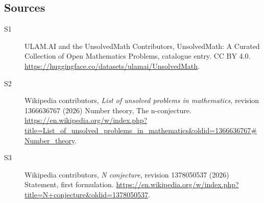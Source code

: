 \documentclass[11pt]{article}
\begin{document}
\subsection{Sources}
\begin{description}
\item[\hypertarget{source:statement:1}{S1}] ULAM.AI and the UnsolvedMath Contributors, UnsolvedMath: A Curated Collection of Open Mathematics Problems, catalogue entry. CC BY 4.0. \url{https://huggingface.co/datasets/ulamai/UnsolvedMath}.
\item[\hypertarget{source:statement:2}{S2}] Wikipedia contributors, \emph{List of unsolved problems in mathematics}, revision 1366636767 (2026) Number theory, The n-conjecture. \url{https://en.wikipedia.org/w/index.php?title=List_of_unsolved_problems_in_mathematics&oldid=1366636767#Number_theory}.
\item[\hypertarget{source:statement:3}{S3}] Wikipedia contributors, \emph{N conjecture}, revision 1378050537 (2026) Statement, first formulation. \url{https://en.wikipedia.org/w/index.php?title=N+conjecture&oldid=1378050537}.
\end{description}
\label{end:statement}
\end{document}
